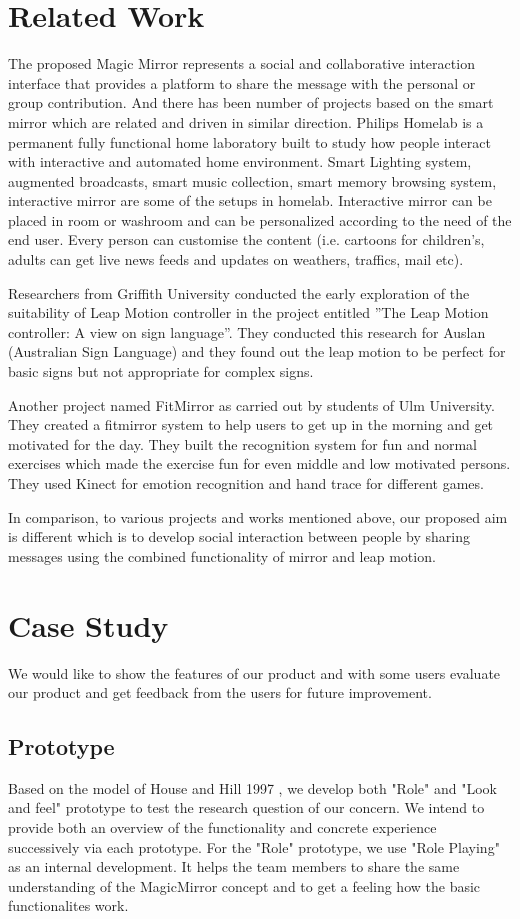 \documentclass{sigchi-ext}
\begin{document}
\section{Related Work}
The proposed Magic Mirror represents a social and collaborative interaction interface that provides a platform to share the message with the personal or group contribution. And there has been number of projects based on the smart mirror which are related and driven in similar direction. Philips Homelab is a permanent fully functional home laboratory built to study how people interact with interactive and automated home environment. Smart Lighting system, augmented broadcasts, smart music collection, smart memory browsing system, interactive mirror are some of the setups in homelab. Interactive mirror can be placed in room or washroom and can be personalized according to the need of the end user. Every person can customise the content (i.e. cartoons for children's, adults can get live news feeds and updates on weathers, traffics, mail etc).

Researchers from Griffith University conducted the early exploration of the suitability of Leap Motion controller in the project entitled ''The Leap Motion controller: A view on sign language''. They conducted this research for Auslan (Australian Sign Language) and they found out the leap motion to be perfect for basic signs but not appropriate for complex signs.

Another project named FitMirror as carried out by students of Ulm University. They created a fitmirror system to help users to get up in the morning and get motivated for the day. They built the recognition system for fun and normal exercises which made the exercise fun for even middle and low motivated persons. They used Kinect for emotion recognition and hand trace for different games.

In comparison, to various projects and works mentioned above, our proposed aim is different which is to develop social interaction between people by sharing messages using the combined functionality of mirror and leap motion.


\section{Case Study}
We would like to show the features of our product and with some users evaluate our product and get feedback from the users for future improvement.
\subsection{Prototype}
Based on the model of House and Hill 1997 \cite{houdeChapter16What1997}, we develop both "Role" and "Look and feel" prototype to test the research question of our concern. We intend to provide both an overview of the functionality and concrete experience successively via each prototype.
For the "Role" prototype, we use "Role Playing" as an internal development. It helps the team members to share the same understanding of the MagicMirror concept and to get a feeling how the basic functionalites work.
\end{document}
